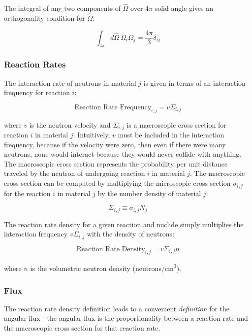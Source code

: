 \documentclass[10pt]{article}
\newcommand{\beq}{\begin{equation}}
\newcommand{\eeq}{\end{equation}}
\newcommand{\hO}{\hat{\Omega}}
\newcommand{\Om}{\Omega}
\begin{document}
\begin{flushleft}
The integral of any two components of \(\hO\) over \(4\pi\) solid angle gives an orthogonality condition for \(\hO\):

\beq
\label{eq:4PiOmegaOmega}
\int_{4\pi}^{ } d\hO\ \Om_i\Om_j = \frac{4\pi}{3}\delta_{ij}
\eeq

\subsubsection{Reaction Rates}

The interaction rate of neutrons in material \(j\) is given in terms of an interaction frequency for reaction \(i\):

\begin{equation}
\label{eq:ReactionFrequency}
\textrm{Reaction Rate Frequency}_{i, j} = v\Sigma_{i, j}
\end{equation}

where \(v\) is the neutron velocity and \(\Sigma_{i, j}\) is a macroscopic cross section for reaction \(i\) in material \(j\). Intuitively, \(v\) must be included in the interaction frequency, because if the velocity were zero, then even if there were many neutrons, none would interact because they would never collide with anything. The macroscopic cross section represents the probability per unit distance traveled by the neutron of undergoing reaction \(i\) in material \(j\). The macroscopic cross section can be computed by multiplying the microscopic cross section \(\sigma_{i,j}\) for the reaction \(i\) in material \(j\) by the number density of material \(j\):

\beq
\Sigma_{i,j}\equiv\sigma_{i,j}N_j
\eeq

The reaction rate density for a given reaction and nuclide simply multiplies the interaction frequency \(v\Sigma_{i,j}\) with the density of neutrons:

\beq
\label{eq:ReactionRateDensity}
\textrm{Reaction Rate Density}_{i,j} = v\Sigma_{i,j}n
\eeq

where \(n\) is the volumetric neutron density (neutrons/cm\textsuperscript{3}). 

\subsubsection{Flux}

The reaction rate density definition leads to a convenient \textit{definition} for the angular flux - the angular flux is the proportionality between a reaction rate and the macroscopic cross section for that reaction rate.


\end{flushleft}
\end{document}
